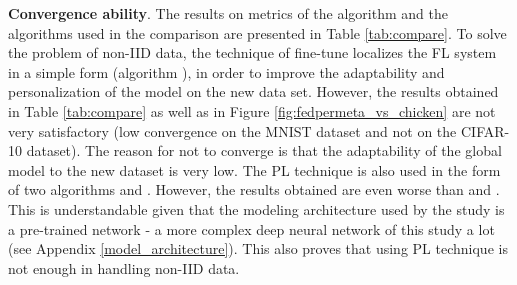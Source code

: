 \documentclass[runningheads]{llncs}
\begin{document}
\textbf{Convergence ability}. The results on metrics of the  algorithm and the algorithms used in the comparison are presented in Table \ref{tab:compare}. To solve the problem of non-IID data, the technique of fine-tune localizes the FL system in a simple form (algorithm ), in order to improve the adaptability and personalization of the model on the new data set. However, the results obtained in Table \ref{tab:compare} as well as in Figure \ref{fig:fedpermeta_vs_chicken} are not very satisfactory (low convergence on the MNIST dataset and not on the CIFAR-10 dataset). The reason for  not to converge is that the adaptability of the global model to the new dataset is very low. The PL technique is also used in the form of two algorithms  and . However, the results obtained are even worse than  and . This is understandable given that the modeling architecture used by the \cite{arivazhagan2019federated} study is a pre-trained network  \cite{howard2017mobilenets} - a more complex deep neural network of this study a lot (see Appendix \ref{model_architecture}). This also proves that using PL technique is not enough in handling non-IID data.
\end{document}
